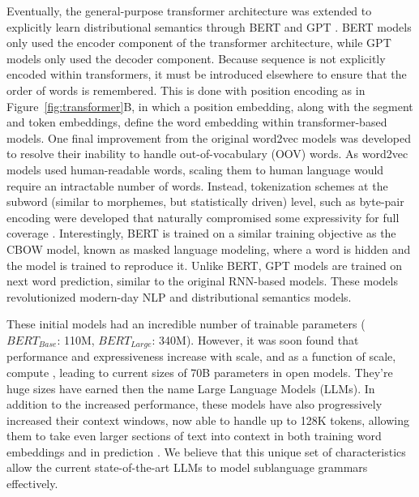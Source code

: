 Eventually, the general-purpose transformer architecture was extended to explicitly learn distributional semantics through BERT \cite{devlin-etal-2019-bert} and GPT \cite{radford2018improving}. BERT models only used the encoder component of the transformer architecture, while GPT models only used the decoder component. Because sequence is not explicitly encoded within transformers, it must be introduced elsewhere to ensure that the order of words is remembered. This is done with position encoding as in Figure~\ref{fig:transformer}B, in which a position embedding, along with the segment and token embeddings, define the word embedding within transformer-based models. One final improvement from the original word2vec models was developed to resolve their inability to handle out-of-vocabulary (OOV) words. As word2vec models used human-readable words, scaling them to human language would require an intractable number of words. Instead, tokenization schemes at the subword (similar to morphemes, but statistically driven) level, such as byte-pair encoding were developed that naturally compromised some expressivity for full coverage \cite{sennrich-etal-2016-neural}. Interestingly, BERT is trained on a similar training objective as the CBOW model, known as masked language modeling, where a word is hidden and the model is trained to reproduce it. Unlike BERT, GPT models are trained on next word prediction, similar to the original RNN-based models. These models revolutionized modern-day NLP and distributional semantics models. 

These initial models had an incredible number of trainable parameters ($BERT_{Base}$: 110M, $BERT_{Large}$: 340M). However, it was soon found that performance and expressiveness increase with scale, and as a function of scale, compute \cite{kaplan2020scaling, bahriExplainingNeuralScaling}, leading to current sizes of 70B parameters in open models. They're huge sizes have earned then the name Large Language Models (LLMs). In addition to the increased performance, these models have also progressively increased their context windows, now able to handle up to 128K tokens, allowing them to take even larger sections of text into context in both training word embeddings and in prediction \cite{openaiGPT4TechnicalReport2024}. We believe that this unique set of characteristics allow the current state-of-the-art LLMs to model sublanguage grammars effectively.

